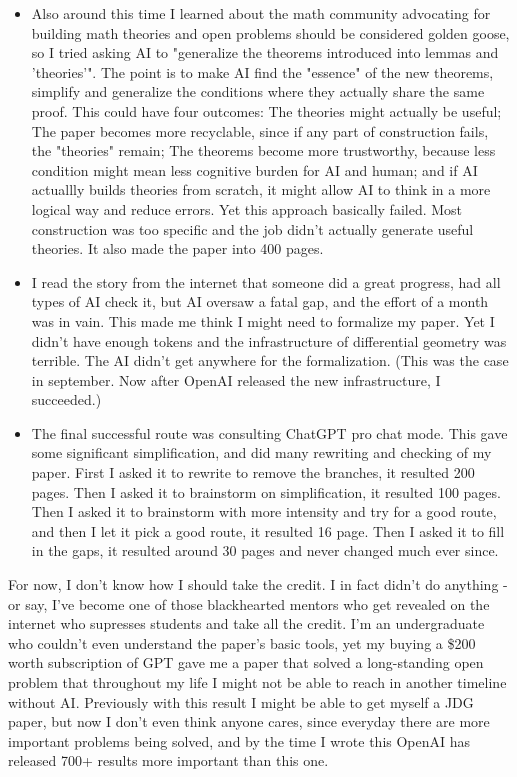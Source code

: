 \documentclass[11pt]{amsart}
\theoremstyle{definition}
\theoremstyle{remark}
\numberwithin{equation}{section}
\begin{document}
\begin{itemize}
\item Also around this time I learned about the math community advocating for building math theories and open problems should be considered golden goose, so I tried asking AI to "generalize the theorems introduced into lemmas and 'theories'". The point is to make AI find the "essence" of the new theorems, simplify and generalize the conditions where they actually share the same proof. This could have four outcomes: The theories might actually be useful; The paper becomes more recyclable, since if any part of construction fails, the "theories" remain; The theorems become more trustworthy, because less condition might mean less cognitive burden for AI and human; and if AI actuallly builds theories from scratch, it might allow AI to think in a more logical way and reduce errors. Yet this approach basically failed. Most construction was too specific and the job didn't actually generate useful theories. It also made the paper into 400 pages.

\item I read the story from the internet that someone did a great progress, had all types of AI check it, but AI oversaw a fatal gap, and the effort of a month was in vain. This made me think I might need to formalize my paper. Yet I didn't have enough tokens and the infrastructure of differential geometry was terrible. The AI didn't get anywhere for the formalization. (This was the case in september. Now after OpenAI released the new infrastructure, I succeeded.)

\item The final successful route was consulting ChatGPT pro chat mode. This gave some significant simplification, and did many rewriting and checking of my paper. First I asked it to rewrite to remove the branches, it resulted 200 pages. Then I asked it to brainstorm on simplification, it resulted 100 pages. Then I asked it to brainstorm with more intensity and try for a good route, and then I let it pick a good route, it resulted 16 page. Then I asked it to fill in the gaps, it resulted around 30 pages and never changed much ever since.

\end{itemize}
For now, I don't know how I should take the credit. I in fact didn't do anything - or say, I've become one of those blackhearted mentors who get revealed on the internet who supresses students and take all the credit. I'm an undergraduate who couldn't even understand the paper's basic tools, yet my buying a \$200 worth subscription of GPT gave me a paper that solved a long-standing open problem that throughout my life I might not be able to reach in another timeline without AI. Previously with this result I might be able to get myself a JDG paper, but now I don't even think anyone cares, since everyday there are more important problems being solved, and by the time I wrote this OpenAI has released 700+ results more important than this one.
\end{document}
